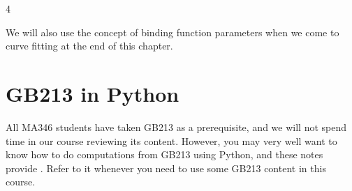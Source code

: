 \documentclass[letterpaper,10pt,english]{jupyterBook}
\begin{document}
\begin{sphinxVerbatim}[commandchars=\\\{\}]
        
       

         

  
\end{sphinxVerbatim}

\begin{sphinxVerbatim}[commandchars=\\\{\}]
4
\end{sphinxVerbatim}

\sphinxAtStartPar
We will also use the concept of binding function parameters when we come to curve fitting at the end of this chapter.


\section{GB213 in Python}
\label{\detokenize{chapter-9-math-and-stats:gb213-in-python}}
\sphinxAtStartPar
All MA346 students have taken GB213 as a prerequisite, and we will not spend time in our course reviewing its content.  However, you may very well want to know how to do computations from GB213 using Python, and these notes provide {\hyperref[\detokenize{GB213-review-in-Python::doc}]{}}.  Refer to it whenever you need to use some GB213 content in this course.
\end{document}
